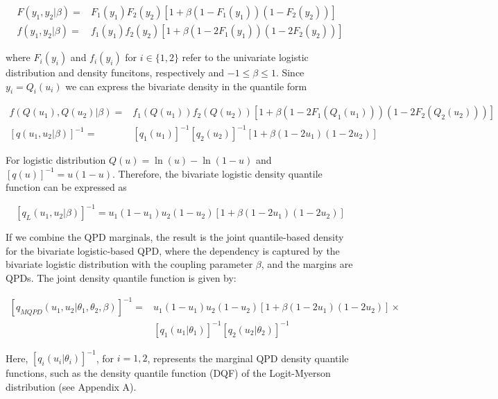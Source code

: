 \documentclass[
]{interact}
\begin{document}
\[
\begin{aligned}
F(y_1,y_2\vert\beta)=&F_1(y_1)F_2(y_2)[1+\beta(1-F_1(y_1))(1-F_2(y_2))]\\
f(y_1,y_2\vert\beta)=&f_1(y_1)f_2(y_2)[1+\beta(1-2F_1(y_1))(1-2F_2(y_2))]
\end{aligned}
\]

where \(F_i(y_i)\) and \(f_i(y_i)\) for \(i\in\{1,2\}\) refer to the
univariate logistic distribution and density funcitons, respectively and
\(-1\leq\beta\leq1\). Since \(y_i=Q_i(u_i)\) we can express the
bivariate density in the quantile form

\[
\begin{aligned}
f(Q(u_1),Q(u_2)\vert\beta)=&f_1(Q(u_1))f_2(Q(u_2))[1+\beta(1-2F_1(Q_1(u_1)))(1-2F_2(Q_2(u_2)))]\\
\left[q(u_1,u_2\vert\beta)\right]^{-1}=&[q_1(u_1)]^{-1}[q_2(u_2)]^{-1}\left[1+\beta (1-2u_1)(1-2u_2)\right]
\end{aligned}
\]

For logistic distribution \(Q(u)=\ln(u)-\ln(1-u)\) and
\([q(u)]^{-1}=u(1-u)\). Therefore, the bivariate logistic density
quantile function can be expressed as

\[
\left[q_L(u_1,u_2\vert\beta)\right]^{-1}=u_1(1-u_1)u_2(1-u_2)\left[1+\beta (1-2u_1)(1-2u_2)\right]
\]

If we combine the QPD marginals, the result is the joint quantile-based
density for the bivariate logistic-based QPD, where the dependency is
captured by the bivariate logistic distribution with the coupling
parameter \(\beta\), and the margins are QPDs. The joint density
quantile function is given by:

\[
\begin{aligned}
\left[q_{MQPD}(u_1,u_2\vert\theta_1,\theta_2, \beta)\right]^{-1}=&u_1(1-u_1)u_2(1-u_2)\left[1+\beta (1-2u_1)(1-2u_2)\right]\times\\
&[q_1(u_1\vert\theta_1)]^{-1}[q_2(u_2\vert\theta_2)]^{-1}
\end{aligned}
\]

Here, \([q_i(u_i\vert\theta_i)]^{-1}\), for \(i=1,2\), represents the
marginal QPD density quantile functions, such as the density quantile
function (DQF) of the Logit-Myerson distribution (see Appendix A).
\end{document}
